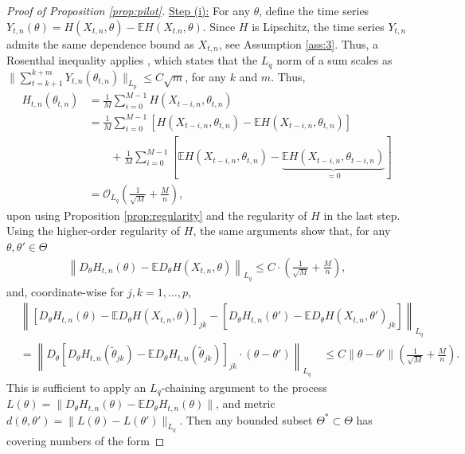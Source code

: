 \documentclass[10pt, a4paper]{article}
\theoremstyle{assumption}
\theoremstyle{definition}
\theoremstyle{theorem}
\newcommand{\E}{\mathbb{E}}
\begin{document}
\begin{proof}[Proof of Proposition \ref{prop:pilot}]
    \underline{Step (i):}
    For any $\theta$, define the time series $Y_{t,n}(\theta) = H(X_{t,n},\theta)-\E H(X_{t.n},\theta)$. 
    Since $H$ is Lipschitz, the time series $Y_{t,n}$ admits the same dependence bound as $X_{t,n}$, see Assumption \ref{ass:3}.
    Thus, a Rosenthal inequality applies \citep[3.2]{mies_sequential_2023}, which states that the $L_q$ norm of a sum scales as $\|\sum_{t=k+1}^{k+m}Y_{t,n}(\theta_{t,n})\|_{L_p} \leq C \sqrt{m}$, for any $k$ and $m$.
    Thus,
    \begin{align*}
        H_{t,n}(\theta_{t,n})
        &= \frac{1}{M} \sum_{i=0}^{M-1} H(X_{t-i,n}, \theta_{t,n}) \\
        &= \frac{1}{M} \sum_{i=0}^{M-1} \left[H(X_{t-i,n}, \theta_{t,n}) - \E H(X_{t-i,n}, \theta_{t,n})\right] \\
        &\qquad + \frac{1}{M} \sum_{i=0}^{M-1} \left[\E H(X_{t-i,n}, \theta_{t,n}) - \underbrace{\E H(X_{t-i,n}, \theta_{t-i,n})}_{=0}\right] \\
        &= \mathcal{O}_{L_q}\left( \tfrac{1}{\sqrt{M}} + \tfrac{M}{n} \right),
    \end{align*}
    upon using Proposition \ref{prop:regularity} and the regularity of $H$ in the last step.
    Using the higher-order regularity of $H$, the same arguments show that, for any $\theta,\theta'\in\Theta$
    \begin{align*}
        \left\|D_\theta H_{t,n}(\theta) - \E D_\theta H(X_{t,n},\theta)\right\|_{L_q} 
        \leq C\cdot \left( \tfrac{1}{\sqrt{M}} + \tfrac{M}{n} \right),
    \end{align*}
    and, coordinate-wise for $j,k=1,\ldots, p$,
    \begin{align*}
        &\left\|\left[ D_\theta H_{t,n}(\theta) - \E D_\theta H(X_{t,n},\theta) \right]_{jk} - \left[ D_\theta H_{t,n}(\theta') - \E D_\theta H(X_{t,n},\theta')_{jk} \right]\right\|_{L_q} \\
        &= \left\| D_\theta [D_\theta H_{t,n}(\tilde{\theta}_{jk})-\E D_\theta H_{t,n}(\tilde{\theta}_{jk})]_{jk} \cdot (\theta-\theta') \right\|_{L_q} 
        \quad \leq C \|\theta-\theta'\| \left( \tfrac{1}{\sqrt{M}} + \tfrac{M}{n} \right).
    \end{align*}
    This is sufficient to apply an $L_q$-chaining argument to the process $L(\theta)=\|D_\theta H_{t,n}(\theta) - \E D_\theta H_{t,n}(\theta)\|$, and metric $d(\theta,\theta') = \|L(\theta)-L(\theta')\|_{L_q}$. 
    Then any bounded subset $\Theta^*\subset \Theta$ has covering numbers of the form 

\end{proof}
\end{document}
